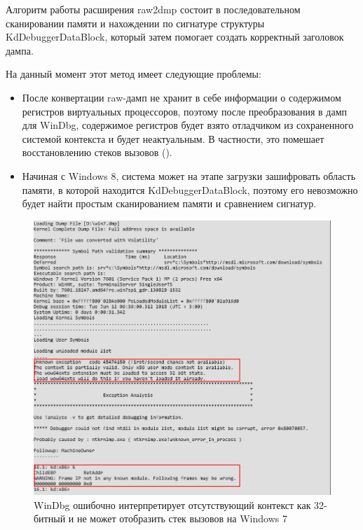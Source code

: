 \documentclass{mipt-thesis-bs}
\begin{document}
Алгоритм работы расширения raw2dmp состоит в последовательном сканировании памяти и нахождении по сигнатуре структуры KdDebuggerDataBlock, который затем помогает создать корректный заголовок дампа.

На данный момент этот метод имеет следующие проблемы:

\begin{itemize}
    \item После конвертации raw-дамп не хранит в себе информации о содержимом регистров виртуальных процессоров, поэтому после преобразования в дамп для WinDbg, содержимое регистров будет взято отладчиком из сохраненного системой контекста и будет неактуальным. В частности, это помешает восстановлению стеков вызовов ().
    \item Начиная с Windows 8, система может на этапе загрузки зашифровать область памяти, в которой находится KdDebuggerDataBlock, поэтому его невозможно будет найти простым сканированием памяти и сравнением сигнатур.
\end{itemize}

\begin{figure}[h]
\begin{center}
    \captionsetup{justification=centering}
    \includegraphics[width=1\textwidth]{vol1.png}
    \caption{WinDbg ошибочно интерпретирует отсутствующий контекст как 32-битный и не может отобразить стек вызовов на Windows 7}
    \label{fig:windbg-vol}
\end{center}
\end{figure}
\end{document}
